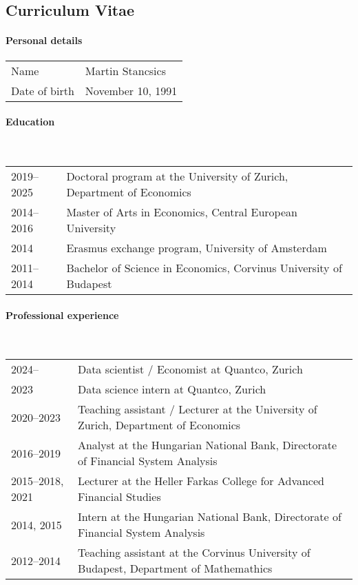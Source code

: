 \begin{titlepage}

    \chapter*{Curriculum Vitae}
    
    \renewcommand{\arraystretch}{1.5}
    
    \subsubsection*{Personal details}
    \begin{tabular}{p{} p{}}
        Name & Martin Stancsics \\
        Date of birth & November 10, 1991
    \end{tabular}
    
    \subsubsection*{Education}\mbox{}\\
    \begin{tabular}{p{} p{}}
        2019--2025 & Doctoral program at the University of Zurich, Department of Economics \\
        2014--2016 & Master of Arts in Economics, Central European University \\
        2014 & Erasmus exchange program, University of Amsterdam \\
        2011--2014 & Bachelor of Science in Economics, Corvinus University of Budapest
    \end{tabular}
    
    \subsubsection*{Professional experience}\mbox{}\\
    \begin{tabular}{p{} p{}}
        2024-- & Data scientist / Economist at Quantco, Zurich \\
        2023 & Data science intern at Quantco, Zurich \\
        2020--2023 & Teaching assistant / Lecturer at the University of Zurich, Department of Economics \\
        2016--2019 & Analyst at the Hungarian National Bank, Directorate of Financial System Analysis \\
        2015--2018, 2021 & Lecturer at the Heller Farkas College for Advanced Financial Studies \\
        2014, 2015 & Intern at the Hungarian National Bank, Directorate of Financial System Analysis \\
        2012--2014 & Teaching assistant at the Corvinus University of Budapest, Department of Mathemathics
    \end{tabular}

\end{titlepage}
